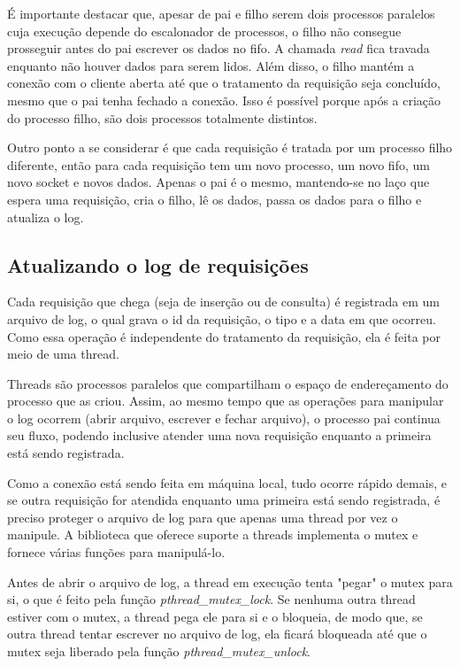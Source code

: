 \documentclass[12pt]{article}
\begin{document}
É importante destacar que, apesar de pai e filho serem dois processos paralelos cuja execução depende do escalonador de processos, o filho não consegue prosseguir antes do pai escrever os dados no fifo. A chamada \emph{read} fica travada enquanto não houver dados para serem lidos. Além disso, o filho mantém a conexão com o cliente aberta até que o tratamento da requisição seja concluído, mesmo que o pai tenha fechado a conexão. Isso é possível porque após a criação do processo filho, são dois processos totalmente distintos.

Outro ponto a se considerar é que cada requisição é tratada por um processo filho diferente, então para cada requisição tem um novo processo, um novo fifo, um novo socket e novos dados. Apenas o pai é o mesmo, mantendo-se no laço que espera uma requisição, cria o filho, lê os dados, passa os dados para o filho e atualiza o log.

\subsection{Atualizando o log de requisições}

Cada requisição que chega (seja de inserção ou de consulta) é registrada em um arquivo de log, o qual grava o id da requisição, o tipo e a data em que ocorreu. Como essa operação é independente do tratamento da requisição, ela é feita por meio de uma thread.

Threads são processos paralelos que compartilham o espaço de endereçamento do processo que as criou. Assim, ao mesmo tempo que as operações para manipular o log ocorrem (abrir arquivo, escrever e fechar arquivo), o processo pai continua seu fluxo, podendo inclusive atender uma nova requisição enquanto a primeira está sendo registrada.

Como a conexão está sendo feita em máquina local, tudo ocorre rápido demais, e se outra requisição for atendida enquanto uma primeira está sendo registrada, é preciso proteger o arquivo de log para que apenas uma thread por vez o manipule. A biblioteca que oferece suporte a threads implementa o mutex e fornece várias funções para manipulá-lo.

Antes de abrir o arquivo de log, a thread em execução tenta "pegar" o mutex para si, o que é feito pela função \emph{pthread\_mutex\_lock}. Se nenhuma outra thread estiver com o mutex, a thread pega ele para si e o bloqueia, de modo que, se outra thread tentar escrever no arquivo de log, ela ficará bloqueada até que o mutex seja liberado pela função \emph{pthread\_mutex\_unlock}.
\end{document}
